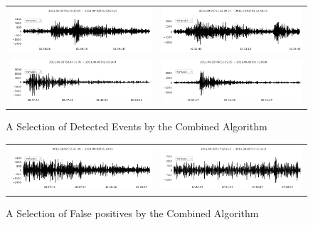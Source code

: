 \documentclass[../report.tex]{subfiles}
\begin{document}
\begin{figure}
	\begin{tabular}{cc}
		\includegraphics[width=65mm]{img/combined-1.png} &   \includegraphics[width=65mm]{img/combined-2.png} \\
		\includegraphics[width=65mm]{img/combined-3.png} &   \includegraphics[width=65mm]{img/combined-4.png} \\
	\end{tabular}
	\caption{A Selection of Detected Events by the Combined Algorithm}
\end{figure}

\begin{figure}
	\begin{tabular}{cc}
		\includegraphics[width=65mm]{img/combined-bad1.png} &   \includegraphics[width=65mm]{img/combined-bad2.png} \\
	\end{tabular}
	\caption{A Selection of False positives by the Combined Algorithm}
\end{figure}
	
\end{document}
